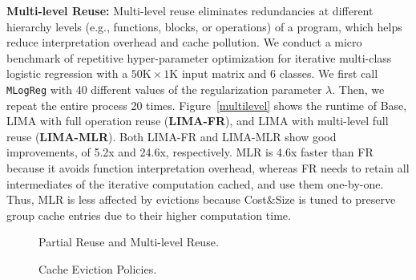 \textbf{Multi-level Reuse:} Multi-level reuse eliminates redundancies at different hierarchy levels (e.g., functions, blocks, or operations) of a program, which helps reduce interpretation overhead and cache pollution. We conduct a micro benchmark of repetitive hyper-parameter optimization for iterative multi-class logistic regression with a $50\text{K} \times 1\text{K}$ input matrix and $6$ classes. We first call \texttt{MLogReg} with 40 different values of the regularization parameter $\lambda$. Then, we repeat the entire process 20 times. Figure~\ref{multilevel} shows the runtime of Base, LIMA with full operation reuse (\textbf{LIMA-FR}), and LIMA with multi-level full reuse (\textbf{LIMA-MLR}). Both LIMA-FR and LIMA-MLR show good improvements, of 5.2x and 24.6x, respectively. MLR is 4.6x faster than FR because it avoids function interpretation overhead, whereas FR needs to retain all intermediates of the iterative computation cached, and use them one-by-one. Thus, MLR is less affected by evictions because Cost\&Size is tuned to preserve group cache entries due to their higher computation time.

\begin{figure}[!t]
	\centering
	\hfill	
	\vspace{-0.45cm}
	\caption{Partial Reuse and Multi-level Reuse.}
\end{figure}

\begin{figure}[!t]
	\centering
	\vspace{-0.6cm}
	\hfill
	\vspace{-0.45cm}
	\caption{Cache Eviction Policies.}
	\vspace{-0.1cm}
\end{figure}
	
